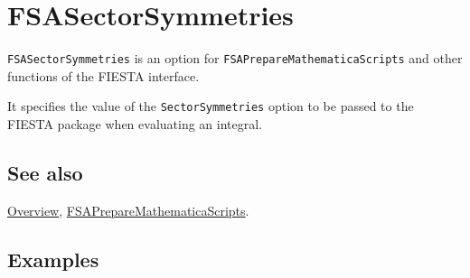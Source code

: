 \documentclass[../FeynHelpersManual.tex]{subfiles}
\begin{document}
\hypertarget{fsasectorsymmetries}{
\section{FSASectorSymmetries}\label{fsasectorsymmetries}}

\texttt{FSASectorSymmetries} is an option for
\texttt{FSAPrepareMathematicaScripts} and other functions of the FIESTA
interface.

It specifies the value of the \texttt{SectorSymmetries} option to be
passed to the FIESTA package when evaluating an integral.

\subsection{See also}

\hyperlink{toc}{Overview},
\hyperlink{fsapreparemathematicascripts}{FSAPrepareMathematicaScripts}.

\subsection{Examples}
\end{document}
